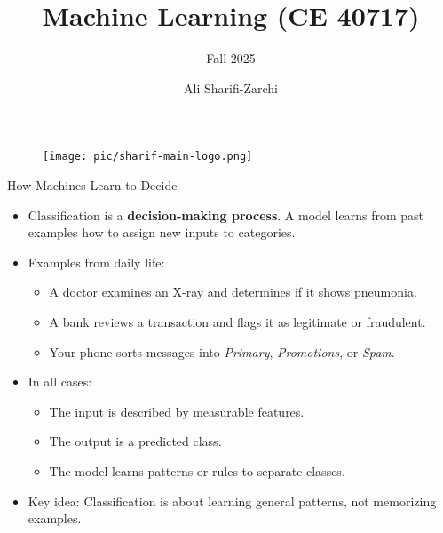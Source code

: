 \documentclass[serif, aspectratio=169]{beamer}
\author{Ali Sharifi-Zarchi}
\title{Machine Learning (CE 40717)}
\subtitle{Fall 2025}
\institute{
    CE Department \\
    Sharif University of Technology
}
\begin{document}
    \begin{frame}
        \titlepage
        \vspace*{-0.6cm}
        \begin{figure}[htpb]
            \begin{center}
                \texttt{[image: pic/sharif-main-logo.png]}
            \end{center}
        \end{figure}
    \end{frame}

    \begin{frame}
        \tableofcontents[sectionstyle=show,
            subsectionstyle=show/shaded/hide,
            subsubsectionstyle=show/shaded/hide]
    \end{frame}


    \begin{frame}{How Machines Learn to Decide}
        \begin{itemize}\itemsep1.2em
        \item Classification is a \textbf{decision-making process}.
        A model learns from past examples how to assign new inputs to categories.

        \item Examples from daily life:
        \begin{itemize}
            \item A doctor examines an X-ray and determines if it shows pneumonia.
            \item A bank reviews a transaction and flags it as legitimate or fraudulent.
            \item Your phone sorts messages into \textit{Primary}, \textit{Promotions}, or \textit{Spam}.
        \end{itemize}

        \item In all cases:
        \begin{itemize}
            \item The input is described by measurable features.
            \item The output is a predicted class.
            \item The model learns patterns or rules to separate classes.
        \end{itemize}

        \item Key idea: Classification is about learning general patterns, not memorizing examples.
        \end{itemize}
    \end{frame}
\end{document}
